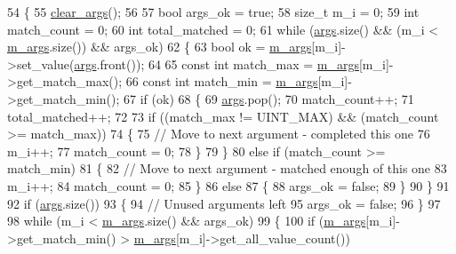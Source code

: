 \begin{DoxyCode}
54 \{
55     \hyperlink{classcli__command__format_ad46a6518742ee179bb193810418aced9}{clear\_args}();
56 
57     \textcolor{keywordtype}{bool} args\_ok = \textcolor{keyword}{true};
58     \textcolor{keywordtype}{size\_t} m\_i = 0;
59     \textcolor{keywordtype}{int} match\_count = 0;
60     \textcolor{keywordtype}{int} total\_matched = 0;
61     \textcolor{keywordflow}{while} (\hyperlink{namespaceastime__fitline_a8187411843a6284ffb964ef3fb9fcab3}{args}.size() && (m\_i < \hyperlink{classcli__command__format_a5a62a08dfd884e04cb69fa9427ff060c}{m\_args}.size()) && args\_ok)
62     \{
63         \textcolor{keywordtype}{bool} ok = \hyperlink{classcli__command__format_a5a62a08dfd884e04cb69fa9427ff060c}{m\_args}[m\_i]->set\_value(\hyperlink{namespaceastime__fitline_a8187411843a6284ffb964ef3fb9fcab3}{args}.front());
64 
65         \textcolor{keyword}{const} \textcolor{keywordtype}{int} match\_max = \hyperlink{classcli__command__format_a5a62a08dfd884e04cb69fa9427ff060c}{m\_args}[m\_i]->get\_match\_max();
66         \textcolor{keyword}{const} \textcolor{keywordtype}{int} match\_min = \hyperlink{classcli__command__format_a5a62a08dfd884e04cb69fa9427ff060c}{m\_args}[m\_i]->get\_match\_min();
67         \textcolor{keywordflow}{if} (ok)
68         \{
69             \hyperlink{namespaceastime__fitline_a8187411843a6284ffb964ef3fb9fcab3}{args}.pop();
70             match\_count++;
71             total\_matched++;
72 
73             \textcolor{keywordflow}{if} ((match\_max != UINT\_MAX) && (match\_count >= match\_max))
74             \{
75                 \textcolor{comment}{// Move to next argument - completed this one}
76                 m\_i++;
77                 match\_count = 0;
78             \}
79         \}
80         \textcolor{keywordflow}{else} \textcolor{keywordflow}{if} (match\_count >= match\_min)
81         \{
82             \textcolor{comment}{// Move to next argument - matched enough of this one}
83             m\_i++;
84             match\_count = 0;
85         \}
86         \textcolor{keywordflow}{else}
87         \{
88             args\_ok = \textcolor{keyword}{false};
89         \}
90     \}
91 
92     \textcolor{keywordflow}{if} (\hyperlink{namespaceastime__fitline_a8187411843a6284ffb964ef3fb9fcab3}{args}.size())
93     \{
94         \textcolor{comment}{// Unused arguments left}
95         args\_ok = \textcolor{keyword}{false};
96     \}
97 
98     \textcolor{keywordflow}{while} (m\_i < \hyperlink{classcli__command__format_a5a62a08dfd884e04cb69fa9427ff060c}{m\_args}.size() && args\_ok)
99     \{
100         \textcolor{keywordflow}{if} (\hyperlink{classcli__command__format_a5a62a08dfd884e04cb69fa9427ff060c}{m\_args}[m\_i]->get\_match\_min() > \hyperlink{classcli__command__format_a5a62a08dfd884e04cb69fa9427ff060c}{m\_args}[m\_i]->get\_all\_value\_count())

\end{DoxyCode}
